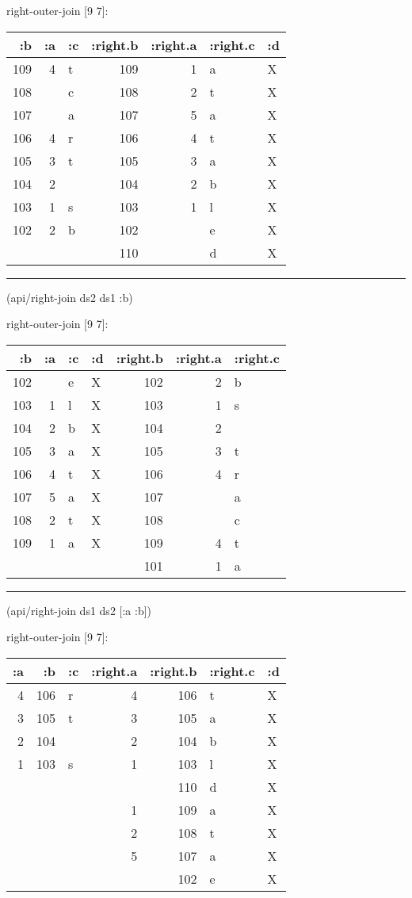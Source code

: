 \documentclass[]{article}
\newenvironment{Shaded}{\begin{snugshade}}{\end{snugshade}}
\newcommand{\AttributeTok}[1]{\textcolor[rgb]{0.77,0.63,0.00}{#1}}
\newcommand{\NormalTok}[1]{#1}
\begin{document}
right-outer-join {[}9 7{]}:

\begin{longtable}[]{@{}rrlrrll@{}}
\toprule
:b & :a & :c & :right.b & :right.a & :right.c & :d\tabularnewline
\midrule
\endhead
109 & 4 & t & 109 & 1 & a & X\tabularnewline
108 & & c & 108 & 2 & t & X\tabularnewline
107 & & a & 107 & 5 & a & X\tabularnewline
106 & 4 & r & 106 & 4 & t & X\tabularnewline
105 & 3 & t & 105 & 3 & a & X\tabularnewline
104 & 2 & & 104 & 2 & b & X\tabularnewline
103 & 1 & s & 103 & 1 & l & X\tabularnewline
102 & 2 & b & 102 & & e & X\tabularnewline
& & & 110 & & d & X\tabularnewline
\bottomrule
\end{longtable}

\begin{center}\rule{0.5\linewidth}{0.5pt}\end{center}

\begin{Shaded}
\begin{Highlighting}[]
\NormalTok{(api/right-join ds2 ds1 }\AttributeTok{:b}\NormalTok{)}
\end{Highlighting}
\end{Shaded}

right-outer-join {[}9 7{]}:

\begin{longtable}[]{@{}rrllrrl@{}}
\toprule
:b & :a & :c & :d & :right.b & :right.a & :right.c\tabularnewline
\midrule
\endhead
102 & & e & X & 102 & 2 & b\tabularnewline
103 & 1 & l & X & 103 & 1 & s\tabularnewline
104 & 2 & b & X & 104 & 2 &\tabularnewline
105 & 3 & a & X & 105 & 3 & t\tabularnewline
106 & 4 & t & X & 106 & 4 & r\tabularnewline
107 & 5 & a & X & 107 & & a\tabularnewline
108 & 2 & t & X & 108 & & c\tabularnewline
109 & 1 & a & X & 109 & 4 & t\tabularnewline
& & & & 101 & 1 & a\tabularnewline
\bottomrule
\end{longtable}

\begin{center}\rule{0.5\linewidth}{0.5pt}\end{center}

\begin{Shaded}
\begin{Highlighting}[]
\NormalTok{(api/right-join ds1 ds2 [}\AttributeTok{:a} \AttributeTok{:b}\NormalTok{])}
\end{Highlighting}
\end{Shaded}

right-outer-join {[}9 7{]}:

\begin{longtable}[]{@{}rrlrrll@{}}
\toprule
:a & :b & :c & :right.a & :right.b & :right.c & :d\tabularnewline
\midrule
\endhead
4 & 106 & r & 4 & 106 & t & X\tabularnewline
3 & 105 & t & 3 & 105 & a & X\tabularnewline
2 & 104 & & 2 & 104 & b & X\tabularnewline
1 & 103 & s & 1 & 103 & l & X\tabularnewline
& & & & 110 & d & X\tabularnewline
& & & 1 & 109 & a & X\tabularnewline
& & & 2 & 108 & t & X\tabularnewline
& & & 5 & 107 & a & X\tabularnewline
& & & & 102 & e & X\tabularnewline
\bottomrule
\end{longtable}
\end{document}
